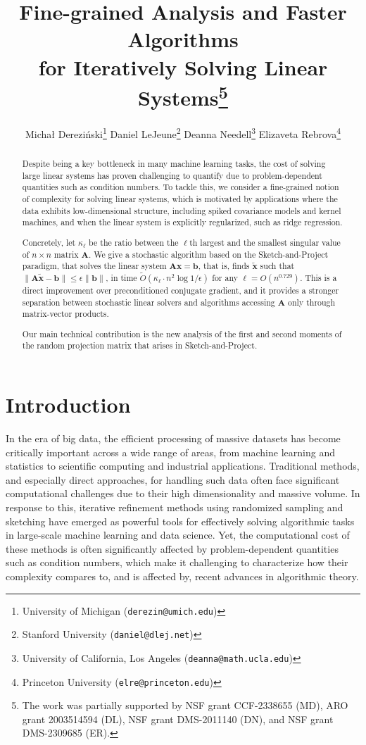 \documentclass[11pt]{article}
\title{Fine-grained Analysis and Faster Algorithms\\
for Iteratively Solving Linear Systems\thanks{The work was partially supported by NSF grant CCF-2338655 (MD), ARO grant 2003514594 (DL), NSF grant DMS-2011140 (DN), and NSF grant
DMS-2309685 (ER).}}
\author{
Micha{\l} Derezi\'nski\thanks{University of Michigan (\texttt{derezin@umich.edu})}
\quad
Daniel LeJeune\thanks{Stanford University (\texttt{daniel@dlej.net})}
\quad 
Deanna Needell\thanks{University of California, Los Angeles (\texttt{deanna@math.ucla.edu})}
\quad
Elizaveta Rebrova\thanks{Princeton University (\texttt{elre@princeton.edu})}
}
\def\x{{\mathbf x}}
\def\b{{\mathbf b}}
\def\A{{\mathbf A}}
\begin{document}
\maketitle


\begin{abstract}
Despite being a key bottleneck in many machine learning tasks, the cost of solving large linear systems has proven challenging to quantify due to problem-dependent quantities such as condition numbers.
To tackle this, we
    consider a fine-grained notion of complexity for solving linear systems, which is motivated by applications where the data exhibits low-dimensional structure, including spiked covariance models and kernel machines, and when the linear system is explicitly regularized, such as ridge regression.
    
    Concretely, let $\kappa_\ell$ be the ratio between the $\ell$th largest and the smallest singular value of $n\times n$ matrix $\A$.
     We give a stochastic algorithm based on the Sketch-and-Project paradigm, that solves the linear system $\A\x=\b$, that is, finds $\tilde{\x}$ such that $\|\A\tilde{\x} - \b\| \le \epsilon \|\b\|$, in time $\tilde O(\kappa_\ell\cdot n^2\log 1/\epsilon)$ for any $\ell = O(n^{0.729})$.
This is a direct improvement over 
preconditioned conjugate gradient, and it provides a stronger separation between stochastic linear solvers and algorithms accessing $\A$ only through matrix-vector products.

Our main technical contribution is the new analysis of the first and second moments of the random projection matrix that arises in Sketch-and-Project.
\end{abstract}



\section{Introduction}
\label{s:intro}

In the era of big data, the efficient processing of massive datasets has become critically important across a wide range of areas, from machine learning and statistics to scientific computing and industrial applications. Traditional methods, and especially direct approaches, for handling such data often face significant computational challenges due to their high dimensionality and massive volume. In response to this, iterative refinement methods using randomized sampling and sketching have emerged as powerful tools for effectively solving algorithmic tasks in large-scale  machine learning and data science. Yet, the computational cost of these methods is often significantly affected by problem-dependent quantities such as condition numbers, which make it challenging to characterize how their complexity compares to, and is affected by, recent advances in algorithmic theory.
\end{document}
